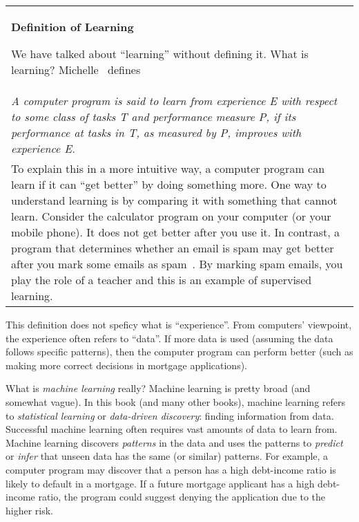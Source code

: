 

\begin{comment}
http://incompleteideas.net/book/bookdraft2017nov5.pdf
Reinforcement Learning: An Introduction
Richard S. Sutton and Andrew G. Barto
\end{comment}

\vspace{0.1in}\begin{tabular}{p{5in}}
\index{definition of learning}
  \begin{center}
    {\bf Definition of Learning}
 \end{center}

  We have talked about ``learning'' without defining it.  What is
  learning? Michelle~\cite{Mitchell1997MachineLearning} defines

  \\
  
  {\it
    A computer program is said to learn from experience E with respect
    to some class of tasks T and performance measure P, if its
    performance at tasks in T, as measured by P, improves with
    experience E.}

  \\

  To explain this in a more intuitive way, a computer program can
  learn if it can ``get better'' by doing something more.  One way to
  understand learning is by comparing it with something that cannot
  learn. Consider the calculator program on your computer (or your
  mobile phone). It does not get better after you use it.  In
  contrast, a program that determines whether an email is spam may get
  better after you mark some emails as
  spam~\cite{Hastie2009ElementsStatisticalLearning}.  By marking spam
  emails, you play the role of a teacher and this is an example of
  supervised learning.

\end{tabular}\vspace{0.1in}

This definition does not speficy what is ``experience''.  From
computers' viewpoint, the experience often refers to ``data''.  If
more data is used (assuming the data follows specific patterns), then
the computer program can perform better (such as making more correct
decisions in mortgage applications).

What is {\it machine learning} really?  Machine learning is pretty
broad (and somewhat vague).  In this book (and many other books),
machine learning refers to {\it statistical learning} or {\it
  data-driven discovery}: finding information from data.  Successful
machine learning often requires vast amounts of data to learn from.
Machine learning discovers {\it patterns} in the data and uses the
patterns to {\it predict} or {\it infer} that unseen data has the same
(or similar) patterns.  For example, a computer program may discover
that a person has a high debt-income ratio is likely to default in a
mortgage.  If a future mortgage applicant has a high debt-income
ratio, the program could suggest denying the application due to the
higher risk.

